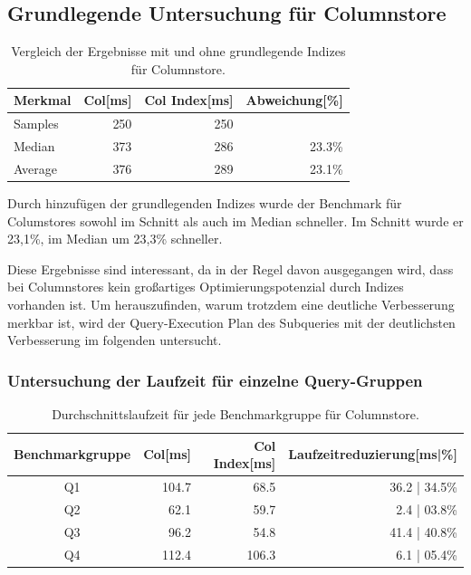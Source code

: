 \subsection{Grundlegende Untersuchung für Columnstore}
\begin{table}[H]
\centering
    \begin{tabularx}{\textwidth}{lrrr}
        \toprule
        Merkmal             &   Col[ms]    &    Col Index[ms] & Abweichung[\%]\\
        \toprule
        Samples             &   250        &   250      &       \\
        \midrule    
        Median              &   373        &   286      & 23.3\%\\
        Average             &   376        &   289      & 23.1\%\\
        \bottomrule
    \end{tabularx}
\caption{Vergleich der Ergebnisse mit und ohne grundlegende Indizes für Columnstore.}
\label{tab:basic_index_col}
\end{table}

Durch hinzufügen der grundlegenden Indizes wurde der Benchmark
für Columstores sowohl im Schnitt als auch im Median schneller.
Im Schnitt wurde er 23,1\%, im Median um 23,3\% schneller.

Diese Ergebnisse sind interessant, da in der Regel davon ausgegangen wird, 
dass bei Columnstores kein großartiges Optimierungspotenzial durch Indizes vorhanden ist.
Um herauszufinden, warum trotzdem eine deutliche Verbesserung merkbar ist,
wird der Query-Execution Plan des Subqueries mit der deutlichsten Verbesserung
im folgenden untersucht.

\subsubsection{Untersuchung der Laufzeit für einzelne Query-Gruppen}

\begin{table}[H]
    \centering
    \begin{tabularx}{\linewidth}{crrr}
        \toprule
        Benchmarkgruppe & Col[ms]   & Col Index[ms] & Laufzeitreduzierung[ms|\%]\\
        \toprule
        Q1              & 104.7       & 68.5            & 36.2 | 34.5\%\\
        Q2              & 62.1        & 59.7            & 2.4 |  03.8\%\\
        Q3              & 96.2        & 54.8            & 41.4 | 40.8\%\\
        Q4              & 112.4       & 106.3           & 6.1 |  05.4\%\\
        \bottomrule
    \end{tabularx}
	\caption{Durchschnittslaufzeit für jede Benchmarkgruppe für Columnstore.}
\end{table}

